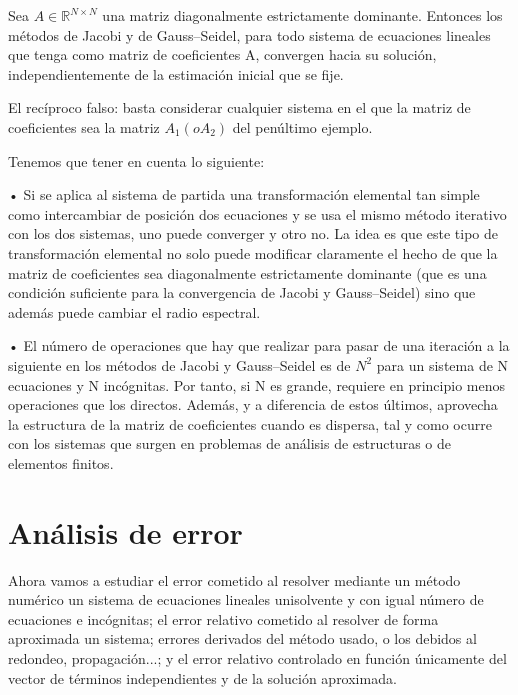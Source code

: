\begin{nprop}
Sea $A \in \mathbb{R}^{N \times N}$ una matriz diagonalmente estrictamente dominante. Entonces los métodos de Jacobi y de Gauss–Seidel, para todo sistema de ecuaciones lineales que tenga como matriz de coeficientes A, convergen hacia su solución, independientemente de la estimación inicial que se fije.
\end{nprop}

El recíproco falso: basta considerar cualquier sistema en el que la matriz de
coeficientes sea la matriz $A_1 (o A_2)$ del penúltimo ejemplo.

\begin{nota}
Tenemos que tener en cuenta lo siguiente:
	\begin{nlist}
	\item[•] Si se aplica al sistema de partida una transformación elemental tan simple como intercambiar de posición dos ecuaciones y se usa el mismo método iterativo con los dos sistemas, uno puede converger y otro no. La idea es que este tipo de transformación elemental no solo puede modificar claramente el hecho de que la matriz de coeficientes sea diagonalmente estrictamente dominante (que es una condición suficiente para la convergencia de Jacobi y Gauss–Seidel) sino que además puede cambiar el radio espectral.
	\item[•] El número de operaciones que hay que realizar para pasar de una iteración a la siguiente en los métodos de Jacobi y Gauss–Seidel es de $N^2$ para un sistema de N ecuaciones y N incógnitas. Por tanto, si N es grande, requiere en principio menos operaciones que los directos. Además, y a diferencia de estos últimos, aprovecha la estructura de la matriz de coeficientes cuando es dispersa, tal y como ocurre con los sistemas que surgen en problemas de análisis de estructuras o de elementos finitos.
	\end{nlist}
\end{nota}

\section{Análisis de error}
Ahora vamos a estudiar el error cometido al resolver mediante un método numérico un sistema de ecuaciones lineales unisolvente y con igual número de ecuaciones e incógnitas; el error relativo cometido al resolver de forma aproximada un sistema; errores derivados del método usado, o los debidos al redondeo, propagación...; y el error relativo controlado en función únicamente del vector de términos independientes y de la solución aproximada.

